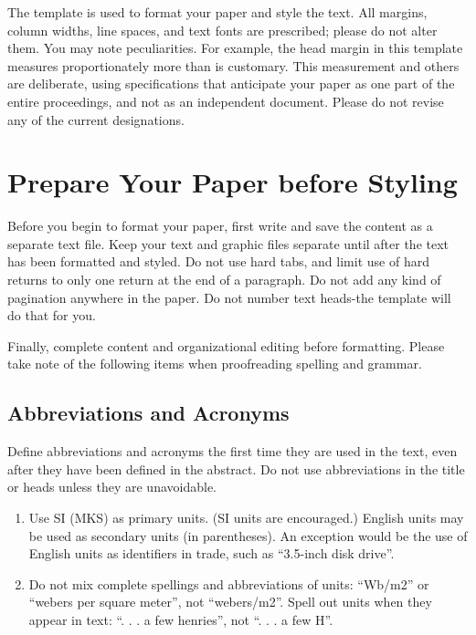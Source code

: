 \documentclass{article} %
\begin{document}
\begin{multicols}{2}
The template is used to format your paper and style the text. All margins, column widths, line spaces, and text fonts are prescribed; please do not alter them. You may note peculiarities. For example, the head margin in this template measures proportionately more than is customary. This measurement and others are deliberate, using specifications that anticipate your paper as one part of the entire proceedings, and not as an independent document. Please do not revise any of the current designations.


\section{Prepare Your Paper before Styling}

Before you begin to format your paper, first write and save the content as a separate text file. Keep your text and graphic files separate until after the text has been formatted and styled. Do not use hard tabs, and limit use of hard returns to only one return at the end of a paragraph. Do not add any kind of pagination anywhere in the paper. Do not number text heads-the template will do that for you.

Finally, complete content and organizational editing before formatting. Please take note of the following items when proofreading spelling and grammar.


\subsection{Abbreviations and Acronyms}

Define abbreviations and acronyms the first time they are used in the text, even after they have been defined in the abstract. Do not use abbreviations in the title or heads unless they are unavoidable.



\begin{enumerate}
\item \textit{ }Use SI (MKS) as primary units. (SI units are encouraged.) English units may be used as secondary units (in parentheses). An exception would be the use of English units as identifiers in trade, such as ``3.5-inch disk drive''.

\item  Do not mix complete spellings and abbreviations of units: ``Wb/m2'' or ``webers per square meter'', not ``webers/m2''.  Spell out units when they appear in text: ``. . . a few henries'', not ``. . . a few H''.


\end{enumerate}
\end{multicols}
\end{document}
